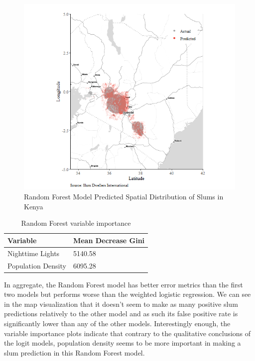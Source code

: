 \begin{figure}
    \centering
    \includegraphics[scale = 0.6]{Graphics/RF Predicted Spatial Distribution of Slums in Kenya.png}
    \caption{Random Forest Model Predicted Spatial Distribution of Slums in Kenya}
    \label{fig:rfPredict}
\end{figure}

\begin{table}[ht]
\centering
\caption{Random Forest variable importance}
\begin{tabular}{ll}
  \hline \hline
  Variable &  Mean Decrease Gini\\ 
  \hline
Nighttime Lights & 5140.58 \\ 
Population Density & 6095.28\\
   \hline
\end{tabular}
\end{table}


In aggregate, the Random Forest model has better error metrics than the first two models but performs worse than the weighted logistic regression. We can see in the map visualization that it doesn't seem to make as many positive slum predictions relatively to the other model and as such its false positive rate is significantly lower than any of the other models. Interestingly enough, the variable importance plots indicate that contrary to the qualitative conclusions of the logit models, population density seems to be more important in making a slum prediction in this Random Forest model.

